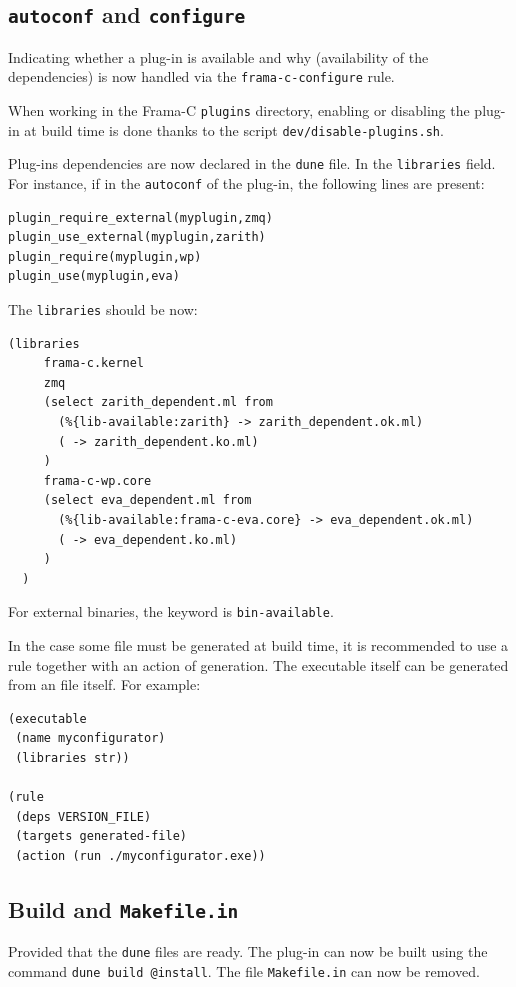 \subsection{\texttt{autoconf} and \texttt{configure}}\label{adv:dune-migration:conf}

Indicating whether a plug-in is available and why (availability of the
dependencies) is now handled via the \texttt{frama-c-configure} rule.

When working in the Frama-C \texttt{plugins} directory, enabling or
disabling the plug-in at build time is done thanks to the script
\texttt{dev/disable-plugins.sh}.

Plug-ins dependencies are now declared in the \texttt{dune} file. In the
\texttt{libraries} field. For instance, if in the \texttt{autoconf} of the
plug-in, the following lines are present:

\begin{lstlisting}
plugin_require_external(myplugin,zmq)
plugin_use_external(myplugin,zarith)
plugin_require(myplugin,wp)
plugin_use(myplugin,eva)
\end{lstlisting}

The \texttt{libraries} should be now:
\begin{lstlisting}[language=Dune]
  (libraries
     frama-c.kernel
     zmq
     (select zarith_dependent.ml from
       (%{lib-available:zarith} -> zarith_dependent.ok.ml)
       ( -> zarith_dependent.ko.ml)
     )
     frama-c-wp.core
     (select eva_dependent.ml from
       (%{lib-available:frama-c-eva.core} -> eva_dependent.ok.ml)
       ( -> eva_dependent.ko.ml)
     )
  )
\end{lstlisting}
For external binaries, the keyword is \texttt{bin-available}.

In the case some file must be generated at build time, it is recommended to use
a rule together with an action of generation. The executable itself can be
generated from an \ocaml file itself. For example:

\begin{lstlisting}[language=Dune]
(executable
 (name myconfigurator)
 (libraries str))

(rule
 (deps VERSION_FILE)
 (targets generated-file)
 (action (run ./myconfigurator.exe))
\end{lstlisting}

\subsection{Build and \texttt{Makefile.in}}
\lstset{language=shell}
Provided that the \lstinline{dune} files are ready. The plug-in can now be
built using the command \texttt{dune build @install}. The file
\lstinline{Makefile.in} can now be removed.

